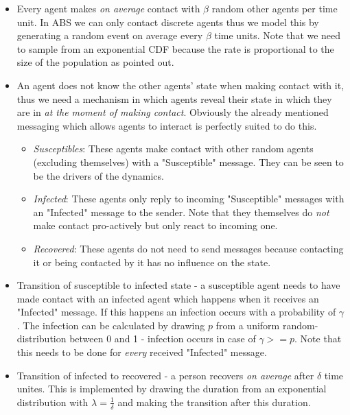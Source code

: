 \begin{itemize}
	\item Every agent makes \textit{on average} contact with $\beta$ random other agents per time unit. In ABS we can only contact discrete agents thus we model this by generating a random event on average every $\beta$ time units. Note that we need to sample from an exponential CDF because the rate is proportional to the size of the population as \cite{borshchev_system_2004} pointed out.
	
	\item An agent does not know the other agents' state when making contact with it, thus we need a mechanism in which agents reveal their state in which they are in \textit{at the moment of making contact}. Obviously the already mentioned messaging which allows agents to interact is perfectly suited to do this.
	\begin{itemize}
		\item \textit{Susceptibles}: These agents make contact with other random agents (excluding themselves) with a "Susceptible" message. They can be seen to be the drivers of the dynamics.
		\item \textit{Infected}: These agents only reply to incoming "Susceptible" messages with an "Infected" message to the sender. Note that they themselves do \textit{not} make contact pro-actively but only react to incoming one. 
		\item \textit{Recovered}: These agents do not need to send messages because contacting it or being contacted by it has no influence on the state.
	\end{itemize}
	
	\item Transition of susceptible to infected state - a susceptible agent needs to have made contact with an infected agent which happens when it receives an "Infected" message. If this happens an infection occurs with a probability of $\gamma$. The infection can be calculated by drawing $p$ from a uniform random-distribution between 0 and 1 - infection occurs in case of $\gamma >= p $. Note that this needs to be done for \textit{every} received "Infected" message.
	
	\item Transition of infected to recovered - a person recovers \textit{on average} after $\delta$ time unites. This is implemented by drawing the duration from an exponential distribution \cite{borshchev_system_2004} with $\lambda = \frac{1}{\delta}$ and making the transition after this duration.
\end{itemize}

